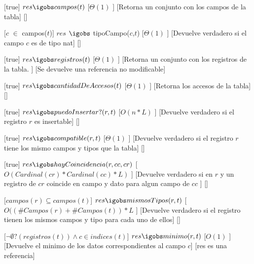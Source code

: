\begin{Interfaz}
  [true] %
  {$res \igobs campos(t)$} %
  [$\Theta(1)$ ] %
  [Retorna un conjunto con los campos de la tabla] %
  [] %

  [$c$ $\in$ campos($t$)] %
  {$res$ $\igobs$ tipoCampo($c$,$t$)} %
  [$\Theta(1)$ ] %
  [Devuelve verdadero si el campo $c$ es de tipo nat] %
  [] %
  
  [true] %
  {$res \igobs registros(t)$} %
  [$\Theta(1)$ ] %
  [Retorna un conjunto con los registros de la tabla. ] %
  [Se devuelve una referencia no modificable] %
  
  [true] %
  {$res \igobs cantidadDeAccesos(t)$} %
  [$\Theta(1)$ ] %
  [Retorna los accesos de la tabla] %
  [] %
  
   [true] %
   {$res \igobs puedoInsertar?(r,t)$} %
   [$O(n*L)$ ] %
   [Devuelve verdadero si el registro $r$ es insertable] %
   [] %
  
   [true] %
   {$res \igobs compatible(r,t)$} %
   [$\Theta(1)$ ] %
   [Devuelve verdadero si el registro $r$ tiene los mismo campos y tipos que la tabla] %
   [] %
   
   [true] %
   {$res \igobs hayCoincidencia(r,cc,cr)$} %
   [$O(Cardinal(cr)*Cardinal(cc)*L)$ ] %
   [Devuelve verdadero si en $r$ y un registro de $cr$ coincide en campo y dato para algun campo de $cc$ ] %
   [] %

   [$ campos(r) \subseteq campos(t) $] %
   {$res \igobs mismosTipos(r,t)$} %
   [$O((\#Campos(r) + \#Campos(t)) * L$ ] %
   [Devuelve verdadero si el registro tienen los mismos campos y tipo para cada uno de ellos] %
   [] %
   
   [$\neg \emptyset ?(registros(t)) \land c \in indices(t)$] %
   {$res \igobs minimo(r,t)$} %
   [$O(1)$ ] %
   [Devuelve el minimo  de los datos correspondientes al campo $c$] %
   [res es una referencia] %
  

\end{Interfaz}

